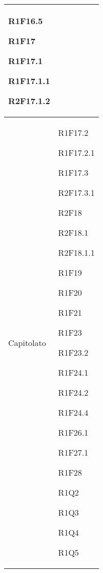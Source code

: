 \begin{center}
\begin{longtable}{|p{44mm}|p{22mm}|}
R1F16.5 \newline

R1F17 \newline

R1F17.1 \newline

R1F17.1.1 \newline

R2F17.1.2 \newline
\\
\hline
Capitolato &

R1F17.2 \newline

R1F17.2.1 \newline

R1F17.3 \newline

R2F17.3.1 \newline

R2F18 \newline

R2F18.1 \newline

R2F18.1.1 \newline

R1F19 \newline

R1F20 \newline

R1F21 \newline

R1F23 \newline

R1F23.2 \newline

R1F24.1 \newline

R1F24.2 \newline

R1F24.4 \newline

R1F26.1 \newline

R1F27.1 \newline

R1F28 \newline

R1Q2 \newline

R1Q3 \newline

R1Q4 \newline

R1Q5 \newline


\end{longtable}
\end{center}

